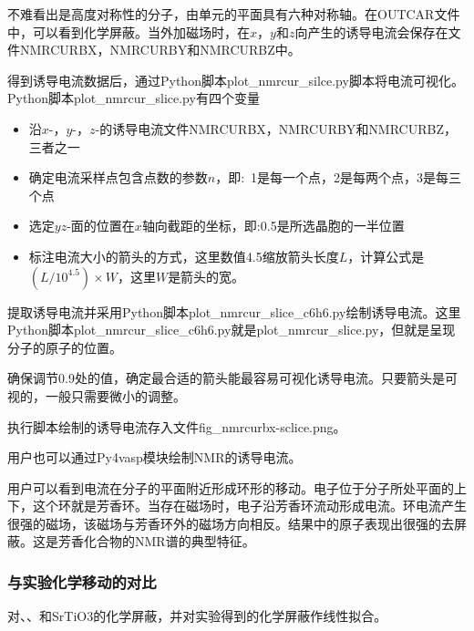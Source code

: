 不难看出是高度对称性的分子，由单元的平面具有六种对称轴。在\textrm{OUTCAR}文件中，可以看到化学屏蔽。当外加磁场时，在$x$，$y$和$z$向产生的诱导电流会保存在文件\textrm{NMRCURBX}，\textrm{NMRCURBY}和\textrm{NMRCURBZ}中。

得到诱导电流数据后，通过\textrm{Python}脚本\textrm{plot\_nmrcur\_silce.py}脚本将电流可视化。\textrm{Python}脚本\textrm{plot\_nmrcur\_slice.py}有四个变量
\begin{itemize}
	\item 沿$x$-，$y$-，$z$-的诱导电流文件\textrm{NMRCURBX}，\textrm{NMRCURBY}和\textrm{NMRCURBZ}，三者之一
	\item 确定电流采样点包含点数的参数$n$，即:~\textsc{1}是每一个点，\textsc{2}是每两个点，\textsc{3}是每三个点
	\item 选定$yz$-面的位置在$x$轴向截距的坐标，即:\textsc{0.5}是所选晶胞的一半位置
	\item 标注电流大小的箭头的方式，这里数值\textsc{4.5}缩放箭头长度$L$，计算公式是$(L/10^{4.5})\times W$，这里$W$是箭头的宽。
\end{itemize}
提取诱导电流并采用\textrm{Python}脚本\textrm{plot\_nmrcur\_slice\_c6h6.py}绘制诱导电流。这里\textrm{Python}脚本\textrm{plot\_nmrcur\_slice\_c6h6.py}就是\textrm{plot\_nmrcur\_slice.py}，但就是呈现分子的原子的位置。


确保调节\textrm{0.9}处的值，确定最合适的箭头能最容易可视化诱导电流。只要箭头是可视的，一般只需要微小的调整。

执行脚本绘制的诱导电流存入文件\textrm{fig\_nmrcurbx-sclice.png}。

用户也可以通过\textrm{Py4vasp}模块绘制\textrm{NMR}的诱导电流。

用户可以看到电流在分子的平面附近形成环形的移动。电子位于分子所处平面的上下，这个环就是芳香环。当存在磁场时，电子沿芳香环流动形成电流。环电流产生很强的磁场，该磁场与芳香环外的磁场方向相反。结果中的原子表现出很强的去屏蔽。这是芳香化合物的\textrm{NMR}谱的典型特征。

\subsubsection{与实验化学移动的对比}
对、、和\textrm{SrTiO3}的化学屏蔽，并对实验得到的化学屏蔽作线性拟合。

